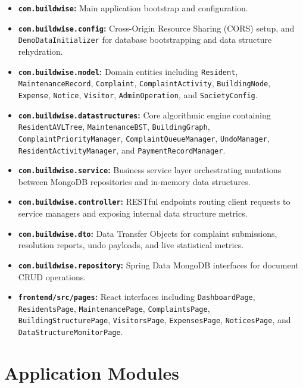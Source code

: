 \documentclass[12pt,a4paper]{article}
\begin{document}
\begin{itemize}[leftmargin=1.5em]
    \item \textbf{\texttt{com.buildwise}:} Main application bootstrap and configuration.
    \item \textbf{\texttt{com.buildwise.config}:} Cross-Origin Resource Sharing (CORS) setup, and \texttt{DemoDataInitializer} for database bootstrapping and data structure rehydration.
    \item \textbf{\texttt{com.buildwise.model}:} Domain entities including \texttt{Resident}, \texttt{MaintenanceRecord}, \texttt{Complaint}, \texttt{ComplaintActivity}, \texttt{BuildingNode}, \texttt{Expense}, \texttt{Notice}, \texttt{Visitor}, \texttt{AdminOperation}, and \texttt{SocietyConfig}.
    \item \textbf{\texttt{com.buildwise.datastructures}:} Core algorithmic engine containing \texttt{ResidentAVLTree}, \texttt{MaintenanceBST}, \texttt{BuildingGraph}, \texttt{ComplaintPriorityManager}, \texttt{ComplaintQueueManager}, \texttt{UndoManager}, \texttt{ResidentActivityManager}, and \texttt{PaymentRecordManager}.
    \item \textbf{\texttt{com.buildwise.service}:} Business service layer orchestrating mutations between MongoDB repositories and in-memory data structures.
    \item \textbf{\texttt{com.buildwise.controller}:} RESTful endpoints routing client requests to service managers and exposing internal data structure metrics.
    \item \textbf{\texttt{com.buildwise.dto}:} Data Transfer Objects for complaint submissions, resolution reports, undo payloads, and live statistical metrics.
    \item \textbf{\texttt{com.buildwise.repository}:} Spring Data MongoDB interfaces for document CRUD operations.
    \item \textbf{\texttt{frontend/src/pages}:} React interfaces including \texttt{DashboardPage}, \texttt{ResidentsPage}, \texttt{MaintenancePage}, \texttt{ComplaintsPage}, \texttt{BuildingStructurePage}, \texttt{VisitorsPage}, \texttt{ExpensesPage}, \texttt{NoticesPage}, and \texttt{DataStructureMonitorPage}.
\end{itemize}

\section{Application Modules}
\end{document}
